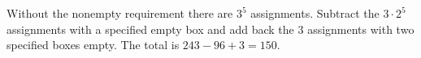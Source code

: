 Without the nonempty requirement there are $3^5$ assignments. Subtract the $3\cdot 2^5$ assignments with a specified empty box and add back the $3$ assignments with two specified boxes empty. The total is $243-96+3=\boxed{150}$.
